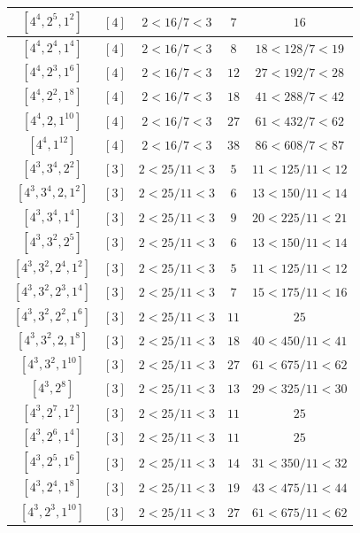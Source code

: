 \documentclass{article}%
\begin{document}
\begin{center}
\begin{longtable}{||c|c|c|c|c||}
$[4^{4}, 2^{5}, 1^{2}]$ & $[4]$ & $2 < 16/7 < 3$ & $7$ & $16$ \\ \hline 
$[4^{4}, 2^{4}, 1^{4}]$ & $[4]$ & $2 < 16/7 < 3$ & $8$ & $18 < 128/7 < 19$ \\ \hline 
$[4^{4}, 2^{3}, 1^{6}]$ & $[4]$ & $2 < 16/7 < 3$ & $12$ & $27 < 192/7 < 28$ \\ \hline 
$[4^{4}, 2^{2}, 1^{8}]$ & $[4]$ & $2 < 16/7 < 3$ & $18$ & $41 < 288/7 < 42$ \\ \hline 
$[4^{4}, 2, 1^{10}]$ & $[4]$ & $2 < 16/7 < 3$ & $27$ & $61 < 432/7 < 62$ \\ \hline 
$[4^{4}, 1^{12}]$ & $[4]$ & $2 < 16/7 < 3$ & $38$ & $86 < 608/7 < 87$ \\ \hline 
$[4^{3}, 3^{4}, 2^{2}]$ & $[3]$ & $2 < 25/11 < 3$ & $5$ & $11 < 125/11 < 12$ \\ \hline 
$[4^{3}, 3^{4}, 2, 1^{2}]$ & $[3]$ & $2 < 25/11 < 3$ & $6$ & $13 < 150/11 < 14$ \\ \hline 
$[4^{3}, 3^{4}, 1^{4}]$ & $[3]$ & $2 < 25/11 < 3$ & $9$ & $20 < 225/11 < 21$ \\ \hline 
$[4^{3}, 3^{2}, 2^{5}]$ & $[3]$ & $2 < 25/11 < 3$ & $6$ & $13 < 150/11 < 14$ \\ \hline 
$[4^{3}, 3^{2}, 2^{4}, 1^{2}]$ & $[3]$ & $2 < 25/11 < 3$ & $5$ & $11 < 125/11 < 12$ \\ \hline 
$[4^{3}, 3^{2}, 2^{3}, 1^{4}]$ & $[3]$ & $2 < 25/11 < 3$ & $7$ & $15 < 175/11 < 16$ \\ \hline 
$[4^{3}, 3^{2}, 2^{2}, 1^{6}]$ & $[3]$ & $2 < 25/11 < 3$ & $11$ & $25$ \\ \hline 
$[4^{3}, 3^{2}, 2, 1^{8}]$ & $[3]$ & $2 < 25/11 < 3$ & $18$ & $40 < 450/11 < 41$ \\ \hline 
$[4^{3}, 3^{2}, 1^{10}]$ & $[3]$ & $2 < 25/11 < 3$ & $27$ & $61 < 675/11 < 62$ \\ \hline 
$[4^{3}, 2^{8}]$ & $[3]$ & $2 < 25/11 < 3$ & $13$ & $29 < 325/11 < 30$ \\ \hline 
$[4^{3}, 2^{7}, 1^{2}]$ & $[3]$ & $2 < 25/11 < 3$ & $11$ & $25$ \\ \hline 
$[4^{3}, 2^{6}, 1^{4}]$ & $[3]$ & $2 < 25/11 < 3$ & $11$ & $25$ \\ \hline 
$[4^{3}, 2^{5}, 1^{6}]$ & $[3]$ & $2 < 25/11 < 3$ & $14$ & $31 < 350/11 < 32$ \\ \hline 
$[4^{3}, 2^{4}, 1^{8}]$ & $[3]$ & $2 < 25/11 < 3$ & $19$ & $43 < 475/11 < 44$ \\ \hline 
$[4^{3}, 2^{3}, 1^{10}]$ & $[3]$ & $2 < 25/11 < 3$ & $27$ & $61 < 675/11 < 62$ \\ \hline 

\end{longtable}
\end{center}
\end{document}
